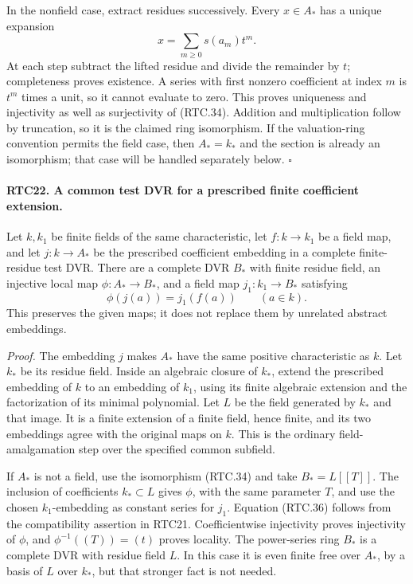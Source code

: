 In the nonfield case, extract residues successively.  Every
\(x\in A_*\) has a unique expansion
\[
 x=\sum_{m\geq0}s(a_m)t^m.
                                                        \tag{RTC.35}
\]
At each step subtract the lifted residue and divide the remainder
by \(t\); completeness proves existence.  A series with first
nonzero coefficient at index \(m\) is \(t^m\) times a unit,
so it cannot evaluate to zero.  This proves uniqueness and
injectivity as well as surjectivity of (RTC.34).  Addition and
multiplication follow by truncation, so it is the claimed ring
isomorphism.  If the valuation-ring convention permits the field
case, then \(A_*=k_*\) and the section is already an isomorphism;
that case will be handled separately below. \hfill\(\square\)

\paragraph{RTC22. A common test DVR for a prescribed finite coefficient extension.}
\label{claim:RTC22}
Let \(k,k_1\) be finite fields of the same characteristic,
let \(f:k\to k_1\) be a field map, and let \(j:k\to A_*\)
be the prescribed coefficient embedding in a complete finite-residue
test DVR.  There are a complete DVR \(B_*\) with finite residue
field, an injective local map \(\phi:A_*\to B_*\), and a
field map \(j_1:k_1\to B_*\) satisfying
\[
       \phi(j(a))=j_1(f(a))\qquad(a\in k).
                                                        \tag{RTC.36}
\]
This preserves the given maps; it does not replace them by
unrelated abstract embeddings.

\emph{Proof.}
The embedding \(j\) makes \(A_*\) have the same positive
characteristic as \(k\).  Let \(k_*\) be its residue field.
Inside an algebraic closure of \(k_*\), extend the prescribed
embedding of \(k\) to an embedding of \(k_1\), using its
finite algebraic extension and the factorization of its minimal
polynomial.  Let \(L\) be the field generated by \(k_*\) and
that image.  It is a finite extension of a finite field, hence
finite, and its two embeddings agree with the original maps on
\(k\).  This is the ordinary field-amalgamation step over the
specified common subfield.

If \(A_*\) is not a field, use the isomorphism (RTC.34) and
take \(B_*=L[[T]]\).  The inclusion of coefficients
\(k_*\subset L\) gives \(\phi\), with the same parameter
\(T\), and use the chosen \(k_1\)-embedding as constant
series for \(j_1\).  Equation (RTC.36) follows from the
compatibility assertion in RTC21.  Coefficientwise injectivity
proves injectivity of \(\phi\), and
\(\phi^{-1}((T))=(t)\) proves locality.  The power-series
ring \(B_*\) is a complete DVR with residue field \(L\).
In this case it is even finite free over \(A_*\), by a basis
of \(L\) over \(k_*\), but that stronger fact is not needed.

